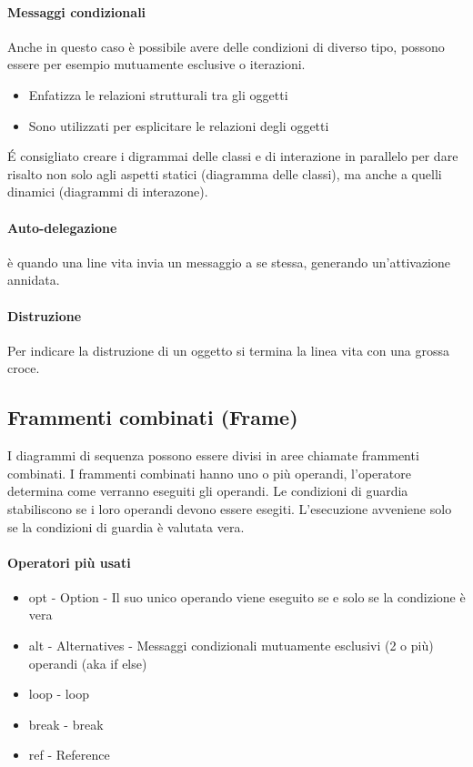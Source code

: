 \paragraph*{Messaggi condizionali} Anche in questo caso è possibile avere delle condizioni di diverso
tipo, possono essere per esempio mutuamente esclusive o iterazioni.
\begin{itemize}
    \item Enfatizza le relazioni strutturali tra gli oggetti
    \item Sono utilizzati per esplicitare le relazioni degli oggetti
\end{itemize}
\'E consigliato creare i digrammai delle classi e di interazione in parallelo per
dare risalto non solo agli aspetti statici (diagramma delle classi), ma anche a quelli
dinamici (diagrammi di interazone).
\paragraph*{Auto-delegazione} è quando una line vita invia un messaggio a se stessa,
generando un'attivazione annidata.
\paragraph*{Distruzione} Per indicare la distruzione di un oggetto si termina la
linea vita con una grossa croce.
\subsection*{Frammenti combinati (Frame)}
I diagrammi di sequenza possono essere divisi in aree chiamate frammenti combinati.
I frammenti combinati hanno uno o più operandi, l'operatore determina come verranno
eseguiti gli operandi. Le condizioni di guardia stabiliscono se i loro operandi devono
essere esegiti. L'esecuzione avveniene solo se la condizioni di guardia è valutata
vera.
\paragraph*{Operatori più usati}
\begin{itemize}
    \item opt - Option - Il suo unico operando viene eseguito se e solo se la condizione è vera
    \item alt - Alternatives - Messaggi condizionali mutuamente esclusivi (2 o più) operandi (aka if else)
    \item loop - loop
    \item break - break
    \item ref - Reference
\end{itemize}
